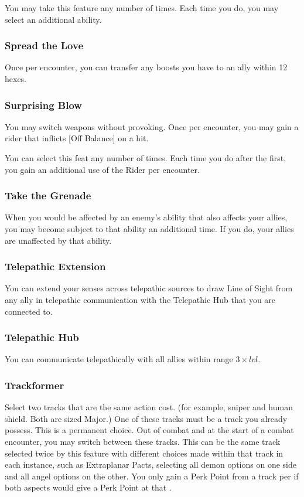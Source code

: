 \begin{multicols*}{2}
You may take this feature any number of times. Each time you do, you may select an additional ability.

\subsubsection{Spread the Love \R }
Once per encounter, you can transfer any boosts you have to an ally within 12 hexes.

\subsubsection{Surprising Blow}
You may switch weapons without provoking.  Once per encounter, you may gain a rider that inflicts [Off Balance] on a hit.

You can select this feat any number of times. Each time you do after the first, you gain an additional use of the Rider per encounter.

\subsubsection{Take the Grenade}
When you would be affected by an enemy’s ability that also affects your allies, you may become subject to that ability an additional time. If you do, your allies are unaffected by that ability.

\subsubsection{Telepathic Extension}
You can extend your senses across telepathic sources to draw Line of Sight from any ally in telepathic communication with the Telepathic Hub that you are connected to.

\subsubsection{Telepathic Hub}
You can communicate telepathically with all allies within range $3\times lvl$.

\subsubsection{Trackformer}
Select two tracks that are the same action cost. (for example, sniper and human shield. Both are sized Major.) One of these tracks must be a track you already possess. This is a permanent choice. Out of combat and at the start of a combat encounter, you may switch between these tracks. This can be the same track selected twice by this feature with different choices made within that track in each instance, such as Extraplanar Pacts, selecting all demon options on one side and all angel options on the other. You only gain a Perk Point from a track per \facet if both aspects would give a Perk Point at that \facet.


\end{multicols*}
